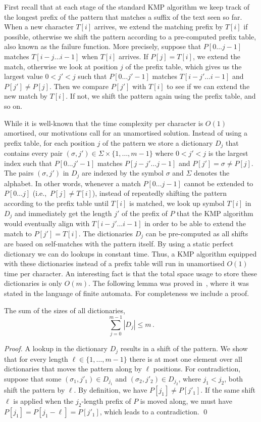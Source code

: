 \documentclass[envcountsame]{llncs}
\renewcommand{\leq}{\leqslant}
\newcommand{\upto}{\ensuremath{\ldots}}
\begin{document}
First recall that at each stage of the standard KMP algorithm we keep track of the longest prefix of the pattern that matches a suffix of the text seen so far. When a new character $T[i]$ arrives, we extend the matching prefix by $T[i]$ if possible, otherwise we shift the pattern according to a pre-computed prefix table, also known as the failure function. More precisely, suppose that $P[0\upto j-1]$ matches $T[i-j\upto i-1]$ when $T[i]$ arrives. If $P[j]=T[i]$, we extend the match, otherwise we look at position $j$ of the prefix table, which gives us the largest value $0<j'<j$ such that $P[0\upto j'-1]$ matches $T[i-j'\upto i-1]$ and $P[j']\neq P[j]$. Then we compare $P[j']$ with $T[i]$ to see if we can extend the new match by $T[i]$. If not, we shift the pattern again using the prefix table, and so on.

While it is well-known that the time complexity per
character is $O(1)$ amortised, our motivations call for an unamortised
solution. Instead of using a prefix table, for each position $j$ of the pattern we store a dictionary $D_j$ that contains every pair $(\sigma, j')\in \Sigma \times \{1,\dots,m-1\}$ where $0<j'<j$ is the largest index such that $P[0\upto j'-1]$ matches $P[j-j'\upto j-1]$ and $P[j']=\sigma \neq P[j]$.
The pairs $(\sigma, j')$ in $D_j$ are indexed by the symbol $\sigma$ and $\Sigma$ denotes the alphabet.
In other words, whenever a match $P[0\upto j-1]$ cannot be extended to $P[0\upto j]$ (i.e.,~$P[j]\neq T[i]$), instead of repeatedly shifting the pattern according to the prefix table until $T[i]$ is matched, we look up symbol $T[i]$ in $D_j$ and immediately get the length $j'$ of the prefix of $P$ that the KMP algorithm would eventually align with $T[i-j'\upto i-1]$ in order to be able to extend the match to $P[j']=T[i]$. The dictionaries $D_j$ can be pre-computed as all shifts are based on self-matches with the pattern itself. By using a static perfect dictionary we can do lookups in constant time. Thus, a KMP algorithm equipped with
these dictionaries instead of a prefix table will run in unamortised $O(1)$ time per character.
An interesting fact is that the total space usage to store these dictionaries is only $O(m)$. The following lemma was proved in~\cite{Simon:1993}, where it was stated in the language of finite automata. For completeness we include a proof.

\begin{lemma}
    \label{lem:shifts}
    The sum of the sizes of all dictionaries, \[ \sum_{j=0}^{m-1} |D_j| \leq m\,.\]
\end{lemma}
\begin{proof}
    A lookup in the dictionary $D_j$ results in a shift of the pattern. We show that for every length $\ell\in\{1,\dots,m-1\}$ there is at most one element over all dictionaries that moves the pattern along by $\ell$ positions. For contradiction, suppose that some $(\sigma_1,j'_1)\in D_{j_1}$ and $(\sigma_2,j'_2)\in D_{j_2}$, where $j_1<j_2$, both shift the pattern by $\ell$. By definition, we have $P[j_1]\neq P[j'_1]$. If the same shift $\ell$ is applied when the $j_2$-length prefix of $P$ is moved along, we must have $P[j_1]=P[j_1-\ell]=P[j'_1]$, which leads to a contradiction.
    \qed
\end{proof}
\end{document}
